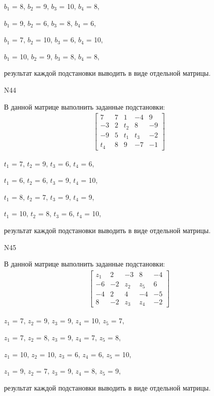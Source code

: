 \documentclass[11pt]{report}
\begin{document}
$b_{1}$ = 8, $b_{2}$ = 9, $b_{3}$ = 10, $b_{4}$ = 8, 

$b_{1}$ = 9, $b_{2}$ = 6, $b_{3}$ = 8, $b_{4}$ = 6, 

$b_{1}$ = 7, $b_{2}$ = 10, $b_{3}$ = 6, $b_{4}$ = 10, 

$b_{1}$ = 10, $b_{2}$ = 9, $b_{3}$ = 8, $b_{4}$ = 8, 

результат каждой подстановки выводить в виде отдельной матрицы.

N44

В данной матрице выполнить заданные подстановки:
\begin{align*}
\left[\begin{matrix}7 & 7 & 1 & -4 & 9\\-3 & 2 & t_{2} & 8 & -9\\-9 & 5 & t_{1} & t_{3} & -2\\t_{4} & 8 & 9 & -7 & -1\end{matrix}\right]
\end{align*}


$t_{1}$ = 7, $t_{2}$ = 9, $t_{3}$ = 6, $t_{4}$ = 6, 

$t_{1}$ = 6, $t_{2}$ = 6, $t_{3}$ = 9, $t_{4}$ = 10, 

$t_{1}$ = 8, $t_{2}$ = 7, $t_{3}$ = 9, $t_{4}$ = 9, 

$t_{1}$ = 10, $t_{2}$ = 8, $t_{3}$ = 6, $t_{4}$ = 10, 

результат каждой подстановки выводить в виде отдельной матрицы.

N45

В данной матрице выполнить заданные подстановки:
\begin{align*}
\left[\begin{matrix}z_{1} & 2 & -3 & 8 & -4\\-6 & -2 & z_{2} & z_{5} & 6\\-4 & 2 & 4 & -4 & -5\\8 & -2 & z_{3} & z_{4} & -2\end{matrix}\right]
\end{align*}


$z_{1}$ = 7, $z_{2}$ = 9, $z_{3}$ = 9, $z_{4}$ = 10, $z_{5}$ = 7, 

$z_{1}$ = 7, $z_{2}$ = 8, $z_{3}$ = 9, $z_{4}$ = 7, $z_{5}$ = 8, 

$z_{1}$ = 10, $z_{2}$ = 10, $z_{3}$ = 6, $z_{4}$ = 6, $z_{5}$ = 10, 

$z_{1}$ = 9, $z_{2}$ = 7, $z_{3}$ = 9, $z_{4}$ = 8, $z_{5}$ = 9, 

результат каждой подстановки выводить в виде отдельной матрицы.
\end{document}
